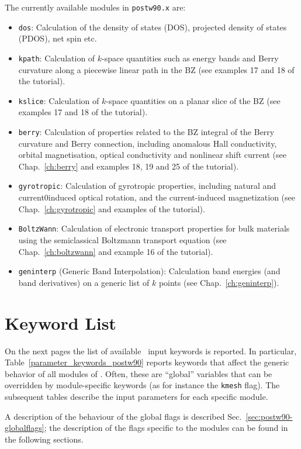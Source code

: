 The currently available modules in \texttt{postw90.x} are:
\begin{itemize}
\item \texttt{dos}: Calculation of the density of states (DOS), projected
  density of states (PDOS), net spin etc.
\item \texttt{kpath}: Calculation of $k$-space quantities such as
  energy bands and Berry curvature along a piecewise linear path in
  the BZ (see examples 17 and 18 of the tutorial).
\item \texttt{kslice}: Calculation of $k$-space quantities on a planar
  slice of the BZ (see examples 17 and 18 of the tutorial).
\item \texttt{berry}: Calculation of properties related to the BZ
  integral of the Berry curvature and Berry connection, including
  anomalous Hall conductivity, orbital magnetisation, optical
  conductivity and nonlinear shift current 
  (see Chap.~\ref{ch:berry} and examples 18, 19 and 25 of the
  tutorial).
\item \texttt{gyrotropic}: Calculation of gyrotropic properties, 
    including natural and current0induced optical rotation, 
and the current-induced magnetization
   (see Chap.~\ref{ch:gyrotropic} and examples  of the
  tutorial).
\item \texttt{BoltzWann}: Calculation of electronic transport
  properties for bulk materials using the semiclassical Boltzmann
  transport equation (see Chap.~\ref{ch:boltzwann} and example 16 of
  the tutorial).
\item \texttt{geninterp} (Generic Band Interpolation): Calculation band energies (and band
  derivatives) on a generic list of $k$ points (see Chap.~\ref{ch:geninterp}).
\end{itemize}


\section{Keyword List}
On the next pages the list of available \postw\ input keywords is
reported.  In particular, Table~\ref{parameter_keywords_postw90}
reports keywords that affect the generic behavior of all modules of
\postw. Often, these are ``global'' variables that can be overridden
by module-specific keywords (as for instance the {\tt kmesh}
flag). The subsequent tables describe the input parameters for each
specific module.

A description of the behaviour of the global flags is described
Sec.~\ref{sec:postw90-globalflags}; the description of the flags
specific to the modules can be found in the following sections.

